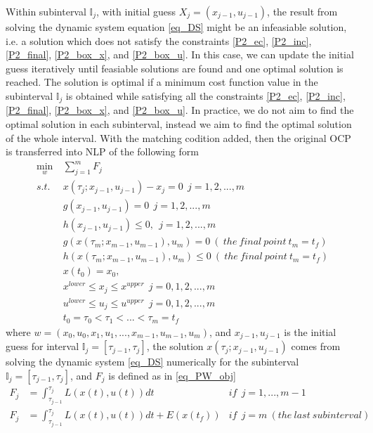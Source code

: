 \documentclass  [
  paper    = a4,
  BCOR     = 10mm,
  twoside,
  fontsize = 12pt,
  fleqn,
  toc      = bibnumbered,
  toc      = listofnumbered,
  numbers  = noendperiod,
  headings = normal,
  listof   = leveldown,
  version  = 3.03
]                                       {scrreprt}
\newcommand{\<}{\langle}
\renewcommand{\>}{\rangle}
\begin{document}
Within subinterval $\mathbb{I}_j$, with initial guess $X_j = (x_{j-1}, u_{j-1})$,  the result from solving the dynamic system equation \ref{eq_DS} might be an infeasiable solution, i.e. a solution which does not satisfy the constraints \ref{P2_ec}, \ref{P2_inc}, \ref{P2_final}, \ref{P2_box_x}, and \ref{P2_box_u}. In this case, we can update the initial guess iteratively until feasiable solutions are found and one optimal solution is reached. The solution is optimal if a minimum cost function value in the subinterval $\mathbb{I}_j$  is obtained while satisfying all the constraints  \ref{P2_ec}, \ref{P2_inc}, \ref{P2_final}, \ref{P2_box_x}, and \ref{P2_box_u}. In practice, we do not aim to find the optimal solution in each subinterval, instead we aim to find the optimal solution of the whole interval. With the matching codition added,  then the original OCP is transferred into NLP of the following form 
	\begin{subequations}
	\begin{align}
		\underset{w}{\text{min}}   \ &  \sum_{j=1}^{m} F_j   \label{P3_obj}   \\
		s.t. \ \ & x(\tau_j; x_{j-1}, u_{j-1}) - x_j = 0   \ \ j = 1, 2, ...,m  \label{P3_eq}  \\
		 &  g(x_{j-1}, u_{j-1}) = 0     \ \ j = 1, 2, ...,m \\
		 & h(x_{j-1}, u_{j-1}) \leq 0,    \ \ j = 1, 2, ...,m     \\
		 		&  g(x(\tau_m; x_{m-1}, u_{m-1}), u_m) = 0  \ (\ the \ final\  point\  t_m=t_f) \\
		 & h(x(\tau_m; x_{m-1}, u_{m-1}), u_m) \leq 0  \ (\ the \ final\  point \ t_m=t_f) \\
		 &  x(t_0) = x_0,  \\
		 & x^{lower} \leq x_j \leq x^{upper}  \ \ j = 0, 1, 2, ...,m  \\
		 & u^{lower} \leq u_j \leq u^{upper}  \ \ j =0,  1, 2, ...,m \\
		         &   t_0 = \tau_0 < \tau_1 < ... < \tau_m = t_f 
	\end{align}
	\label{P3_MSNLP}
\end{subequations}  
where $w = (x_0, u_0, x_1, u_1, ..., x_{m-1}, u_{m-1}, u_m) $, and $x_{j-1}, u_{j-1}$ is the initial guess  for interval $\mathbb{I}_j = [\tau_{j-1}, \tau_j]$, the  solution  $x(\tau_j; x_{j-1}, u_{j-1})$ comes from solving the dynamic system \ref{eq_DS} numerically for the subinterval $\mathbb{I}_j = [\tau_{j-1}, \tau_j]$,  and $F_j$ is defined as in \ref{eq_PW_obj}
\begin{equation}\label{eq_PW_obj}
	\begin{aligned}
		F_j &= \int_{\tau_{j-1}}^{\tau_j}L(x(t), u(t))dt   &if \ \   j= 1, ..., m-1 \\ 
		F_j  & = \int_{\tau_{j-1}}^{\tau_j}L(x(t), u(t))dt + E (x(t_f)) &if\ \   j =m  \ (the\  last\  subinterval)
	\end{aligned}
\end{equation}
\end{document}
